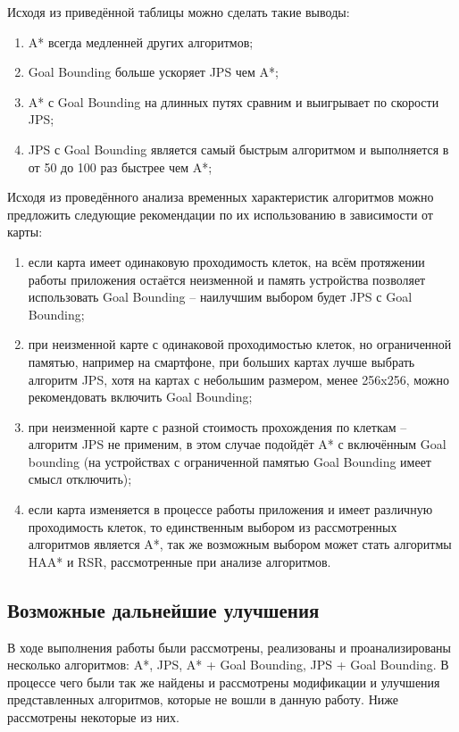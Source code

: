 Исходя из приведённой таблицы можно сделать такие выводы:

\begin{enumerate}
	\item A* всегда медленней других алгоритмов;
	\item Goal Bounding больше ускоряет JPS чем A*;
	\item A* с Goal Bounding на длинных путях сравним и выигрывает по скорости JPS;
	\item JPS с Goal Bounding является самый быстрым алгоритмом и выполняется в от 50 до 100 раз быстрее чем A*; 
\end{enumerate}

Исходя из проведённого анализа временных характеристик алгоритмов можно предложить следующие рекомендации по их использованию в зависимости от карты:

\begin{enumerate}
	\item если карта имеет одинаковую проходимость клеток, на всём протяжении работы приложения остаётся неизменной и память устройства позволяет использовать Goal Bounding -- наилучшим выбором будет JPS с Goal Bounding;
	\item при неизменной карте с одинаковой проходимостью клеток, но ограниченной памятью, например на смартфоне, при больших картах лучше выбрать алгоритм JPS, хотя на картах с небольшим размером, менее 256x256, можно рекомендовать включить Goal Bounding;
	\item при неизменной карте с разной стоимость прохождения по клеткам -- алгоритм JPS не применим, в этом случае подойдёт A* с включённым Goal bounding (на устройствах с ограниченной памятью Goal Bounding имеет смысл отключить);
	\item если карта изменяется в процессе работы приложения и имеет различную проходимость клеток, то единственным выбором из рассмотренных алгоритмов является A*, так же возможным выбором может стать алгоритмы HAA* и RSR, рассмотренные при анализе алгоритмов.
\end{enumerate}

\subsection{Возможные дальнейшие улучшения}

В ходе выполнения работы были рассмотрены, реализованы и проанализированы несколько алгоритмов: A*, JPS, A* + Goal Bounding, JPS + Goal Bounding. В процессе чего были так же найдены и рассмотрены модификации и улучшения представленных алгоритмов, которые не вошли в данную работу. Ниже рассмотрены некоторые из них.

